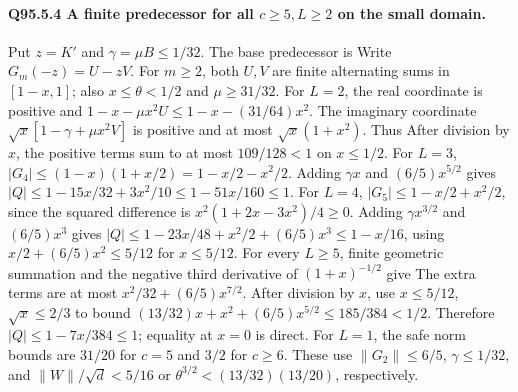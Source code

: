 \paragraph{Q95.5.4 A finite predecessor for all \(c\ge\allowbreak 5,\allowbreak L\ge\allowbreak 2\) on the small domain.}
Put \(z=\allowbreak K'\) and \(\gamma=\allowbreak \mu B\le\allowbreak 1/32\). The base predecessor is
Write \(G_m(-z)=\allowbreak U-zV\). For \(m\ge\allowbreak 2\), both \(U,\allowbreak V\) are finite
alternating sums in \([1-x,\allowbreak 1]\); also \(x\le\allowbreak \theta<\allowbreak 1/2\) and
\(\mu\ge\allowbreak 31/32\).
For \(L=\allowbreak 2\), the real coordinate is positive and
\(1-x-\mu x^2U\le\allowbreak 1-x-(31/64)x^2\).
The imaginary coordinate \(\sqrt x[1-\gamma+\mu x^2V]\) is positive
and at most \(\sqrt x(1+x^2)\). Thus
After division by \(x\), the positive terms sum to at most
\(109/128<\allowbreak 1\) on \(x\le\allowbreak 1/2\).
For \(L=\allowbreak 3\), \(|G_4|\le\allowbreak (1-x)(1+x/2)=\allowbreak 1-x/2-x^2/2\).
Adding \(\gamma x\) and \((6/5)x^{5/2}\) gives
\(|Q|\le\allowbreak 1-15x/32+3x^2/10\le\allowbreak 1-51x/160\le\allowbreak 1\).
For \(L=\allowbreak 4\), \(|G_5|\le\allowbreak 1-x/2+x^2/2\), since the squared
difference is \(x^2(1+2x-3x^2)/4\ge\allowbreak 0\). Adding
\(\gamma x^{3/2}\) and \((6/5)x^3\) gives
\(|Q|\le\allowbreak 1-23x/48+x^2/2+(6/5)x^3\le\allowbreak 1-x/16\), using
\(x/2+(6/5)x^2\le\allowbreak 5/12\) for \(x\le\allowbreak 5/12\).
For every \(L\ge\allowbreak 5\), finite geometric summation and the negative
third derivative of \((1+x)^{-1/2}\) give
The extra terms are at most \(x^2/32+(6/5)x^{7/2}\).
After division by \(x\), use \(x\le\allowbreak 5/12\), \(\sqrt x\le\allowbreak 2/3\) to bound
\((13/32)x+x^2+(6/5)x^{5/2}\le\allowbreak 185/384<\allowbreak 1/2\).
Therefore \(|Q|\le\allowbreak 1-7x/384\le\allowbreak 1\); equality at \(x=\allowbreak 0\) is direct.
For \(L=\allowbreak 1\), the safe norm bounds are \(31/20\) for \(c=\allowbreak 5\) and
\(3/2\) for \(c\ge\allowbreak 6\). These use \(\|G_2\|\le\allowbreak 6/5\),
\(\gamma\le\allowbreak 1/32\), and \(\|W\|/\sqrt d<\allowbreak 5/16\) or
\(\theta^{3/2}<\allowbreak (13/32)(13/20)\), respectively.

